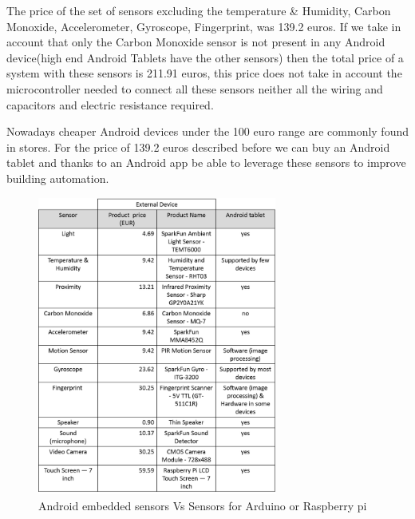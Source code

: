 The price of the  set of sensors excluding the temperature \& Humidity, Carbon Monoxide, Accelerometer, Gyroscope, Fingerprint, was 139.2 euros. If we take in account that only the Carbon Monoxide sensor is not present in any Android device(high end Android Tablets have the other sensors) then the total price of a system with these sensors is 211.91 euros, this price does not take in account the microcontroller needed to connect all these sensors neither all the wiring and capacitors and electric resistance required.

Nowadays cheaper Android devices under the 100 euro range are commonly found in stores. For the price of 139.2 euros described before we can buy an Android tablet and thanks to an Android app be able to leverage these sensors to improve building automation.

\begin{figure}[h]
\centering
\includegraphics[width=0.7\textwidth]{Figures/table_sensors}
\caption{Android embedded sensors Vs Sensors for Arduino or Raspberry pi}
\label{table_sensors}
\end{figure}



